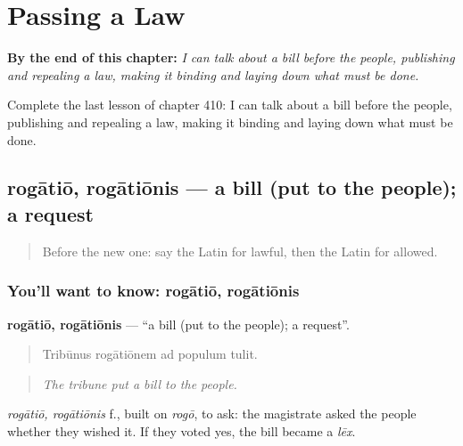 
\chapter{Passing a Law}
\label{ch:la-passing-a-law}

\begin{chapteropening}
\textbf{By the end of this chapter:} \emph{I can talk about a bill before the people, publishing and repealing a law, making it binding and laying down what must be done.}

Complete the last lesson of chapter 410: I can talk about a bill before the people, publishing and repealing a law, making it binding and laying down what must be done.
\end{chapteropening}

\section[rogātiō, rogātiōnis]{rogātiō, rogātiōnis — a bill (put to the people); a request}

\label{lesson:LA-C410-rogatio}



\begin{quote}
Before the new one: say the Latin for lawful, then the Latin for allowed.
\end{quote}

\subsection*{You'll want to know: rogātiō, rogātiōnis}
\textbf{rogātiō, rogātiōnis} — \textquotedblleft{}a bill (put to the people); a request\textquotedblright{}.

\begin{quote}
Tribūnus rogātiōnem ad populum tulit.
\end{quote}

\begin{quote}
\emph{The tribune put a bill to the people.}
\end{quote}

\emph{rogātiō, rogātiōnis} f., built on \emph{rogō}, to ask: the magistrate asked the people whether they wished it. If they voted yes, the bill became a \emph{lēx}.

